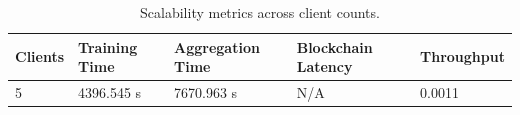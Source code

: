 \begin{table}[t]
\centering
\caption{Scalability metrics across client counts.}
\label{tab:scalability}
\begin{tabular}{lllll}
\hline
Clients & Training Time & Aggregation Time & Blockchain Latency & Throughput \\
\hline
5 & 4396.545 s & 7670.963 s & N/A & 0.0011 \\
\hline
\end{tabular}
\end{table}

